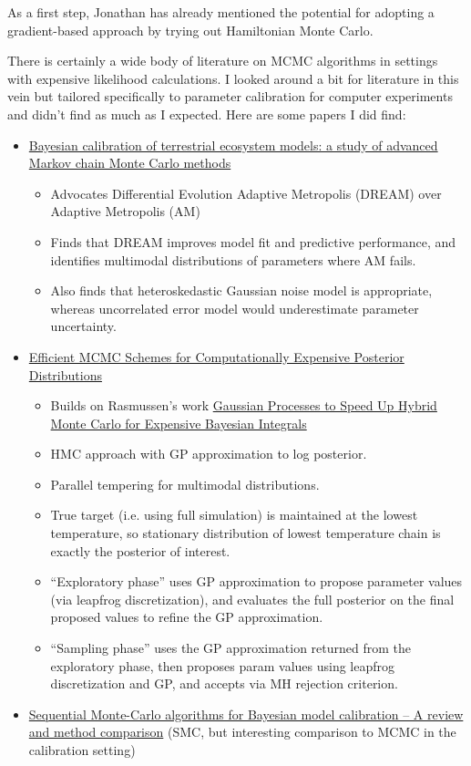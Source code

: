 \documentclass[12pt]{article}
\begin{document}
As a first step, Jonathan has already mentioned the potential for adopting a gradient-based approach by trying out Hamiltonian Monte Carlo. 

There is certainly a wide body of literature on MCMC algorithms in settings with expensive likelihood calculations. I looked around a bit for literature in this vein but 
tailored specifically to parameter calibration for computer experiments and didn't find as much as I expected. Here are some papers I did find: 
\begin{itemize}
\item \href{https://bg.copernicus.org/articles/14/4295/2017/}{Bayesian calibration of terrestrial ecosystem models: a study of advanced Markov chain Monte Carlo methods}
	\begin{itemize}
	\item Advocates Differential Evolution Adaptive Metropolis (DREAM) over Adaptive Metropolis (AM)
	\item Finds that DREAM improves model fit and predictive performance, and identifies multimodal distributions of parameters where AM fails. 
	\item Also finds that heteroskedastic Gaussian noise model is appropriate, whereas uncorrelated error model would underestimate parameter uncertainty. 
	\end{itemize}
\item \href{https://www.tandfonline.com/doi/abs/10.1198/TECH.2010.09195}{Efficient MCMC Schemes for Computationally Expensive Posterior Distributions}
	\begin{itemize}
	\item Builds on Rasmussen's work \href{http://mlg.eng.cam.ac.uk/pub/pdf/Ras03.pdf}{Gaussian Processes to Speed Up Hybrid Monte Carlo for Expensive Bayesian Integrals}
	\item HMC approach with GP approximation to log posterior.
	\item Parallel tempering for multimodal distributions.
	\item True target (i.e. using full simulation) is maintained at the lowest temperature, so stationary distribution of lowest temperature chain is exactly the posterior of interest. 
	\item ``Exploratory phase'' uses GP approximation to propose parameter values (via leapfrog discretization), and evaluates the full posterior on the final proposed values to refine the GP approximation.
	\item ``Sampling phase'' uses the GP approximation returned from the exploratory phase, then proposes param values using leapfrog discretization and GP, and accepts via MH rejection criterion.
	\end{itemize}
\item \href{https://www.sciencedirect.com/science/article/pii/S0304380021001708}{Sequential Monte-Carlo algorithms for Bayesian model calibration – A review and method comparison} 
(SMC, but interesting comparison to MCMC in the calibration setting)
\end{itemize}
\end{document}
